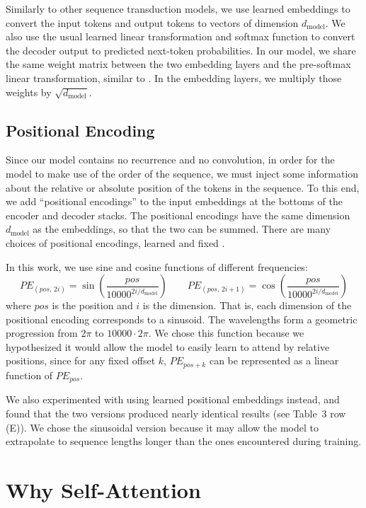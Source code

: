 Similarly to other sequence transduction models, we use learned embeddings to
convert the input tokens and output tokens to vectors of dimension
$d_{\text{model}}$. We also use the usual learned linear transformation and
softmax function to convert the decoder output to predicted next-token
probabilities. In our model, we share the same weight matrix between the two
embedding layers and the pre-softmax linear transformation, similar to
\cite{press2016using}. In the embedding layers, we multiply those weights by
$\sqrt{d_{\text{model}}}$.

\subsection{Positional Encoding}

Since our model contains no recurrence and no convolution, in order for the
model to make use of the order of the sequence, we must inject some information
about the relative or absolute position of the tokens in the sequence. To this
end, we add ``positional encodings'' to the input embeddings at the bottoms of
the encoder and decoder stacks. The positional encodings have the same dimension
$d_{\text{model}}$ as the embeddings, so that the two can be summed. There are
many choices of positional encodings, learned and fixed \cite{gehring2017convolutional}.

In this work, we use sine and cosine functions of different frequencies:
\[
  PE_{(pos,\,2i)}   = \sin\!\left(\frac{pos}{10000^{2i/d_{\text{model}}}}\right)
  \qquad
  PE_{(pos,\,2i+1)} = \cos\!\left(\frac{pos}{10000^{2i/d_{\text{model}}}}\right)
\]
where $pos$ is the position and $i$ is the dimension. That is, each dimension
of the positional encoding corresponds to a sinusoid. The wavelengths form a
geometric progression from $2\pi$ to $10000 \cdot 2\pi$. We chose this function
because we hypothesized it would allow the model to easily learn to attend by
relative positions, since for any fixed offset $k$,
$PE_{pos+k}$ can be represented as a linear function of $PE_{pos}$.

We also experimented with using learned positional embeddings
\cite{gehring2017convolutional} instead, and found that the two versions
produced nearly identical results (see Table~3 row (E)). We chose the sinusoidal
version because it may allow the model to extrapolate to sequence lengths longer
than the ones encountered during training.

\section{Why Self-Attention}

